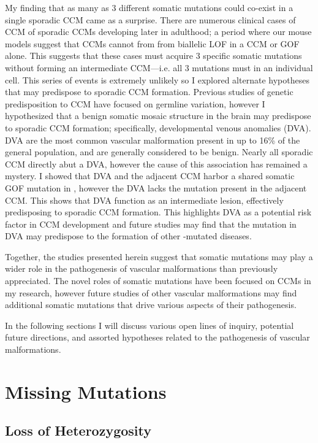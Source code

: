 My finding that as many as 3 different somatic mutations could co-exist in a single sporadic CCM came as a surprise. There are numerous clinical cases of CCM of sporadic CCMs developing later in adulthood; a period where our mouse models suggest that CCMs cannot from from biallelic LOF in a CCM or  GOF alone. This suggests that these cases must acquire 3 specific somatic mutations without forming an intermediate CCM---i.e. all 3 mutations must  in an individual cell. This series of events is extremely unlikely so I explored alternate hypotheses that may predispose to sporadic CCM formation. Previous studies of genetic predisposition to CCM have focused on germline variation, however I hypothesized that a benign somatic mosaic structure in the brain may predispose to sporadic CCM formation; specifically, developmental venous anomalies (DVA). DVA are the most common vascular malformation present in up to 16\% of the general population, and are generally considered to be benign. Nearly all sporadic CCM directly abut a DVA, however the cause of this association has remained a mystery. I showed that DVA and the adjacent CCM harbor a shared somatic GOF mutation in , however the DVA lacks the  mutation present in the adjacent CCM. This shows that DVA function as an intermediate lesion, effectively predisposing to sporadic CCM formation. This highlights DVA as a potential risk factor in CCM development and future studies may find that the  mutation in DVA may predispose to the formation of other -mutated diseases.

Together, the studies presented herein suggest that somatic mutations may play a wider role in the pathogenesis of vascular malformations than previously appreciated. The novel roles of somatic mutations have been focused on CCMs in my research, however future studies of other vascular malformations may find additional somatic mutations that drive various aspects of their pathogenesis. 

In the following sections I will discuss various open lines of inquiry, potential future directions, and assorted hypotheses related to the pathogenesis of vascular malformations. 

\section{Missing Mutations}
\subsection{Loss of Heterozygosity}
